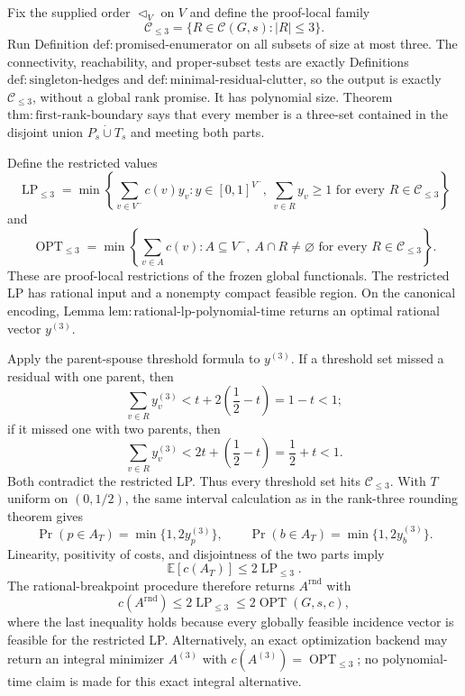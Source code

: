 Fix the supplied order \(\triangleleft_V\) on \(V\) and define the
proof-local family
\[
 \mathcal C_{\leq3}=\{R\in\mathcal C(G,s):|R|\leq3\}.
\]
Run Definition \(\mathrm{def{:}promised\mbox{-}enumerator}\) on all
subsets of size at most three.  The connectivity, reachability, and
proper-subset tests are exactly Definitions
\(\mathrm{def{:}singleton\mbox{-}hedges}\) and
\(\mathrm{def{:}minimal\mbox{-}residual\mbox{-}clutter}\), so the output
is exactly \(\mathcal C_{\leq3}\), without a global rank promise.  It has
polynomial size.  Theorem
\(\mathrm{thm{:}first\mbox{-}rank\mbox{-}boundary}\) says that every
member is a three-set contained in the disjoint union
\(P_s\mathbin{\dot\cup}T_s\) and meeting both parts.

Define the restricted values
\[
 \operatorname{LP}_{\leq3}
 =\min\left\{\sum_{v\in V^{-}}c(v)y_v:
 y\in[0,1]^{V^{-}},\ \sum_{v\in R}y_v\geq1
 \text{ for every }R\in\mathcal C_{\leq3}\right\}
\]
and
\[
 \operatorname{OPT}_{\leq3}
 =\min\left\{\sum_{v\in A}c(v):
 A\subseteq V^{-},\ A\cap R\neq\varnothing
 \text{ for every }R\in\mathcal C_{\leq3}\right\}.
\]
These are proof-local restrictions of the frozen global functionals.  The
restricted LP has rational input and a nonempty compact feasible region.
On the canonical encoding, Lemma
\(\mathrm{lem{:}rational\mbox{-}lp\mbox{-}polynomial\mbox{-}time}\)
returns an optimal rational vector \(y^{(3)}\).

Apply the parent-spouse threshold formula to \(y^{(3)}\).  If a threshold
set missed a residual with one parent, then
\[
 \sum_{v\in R}y^{(3)}_v
 <t+2\left(\frac12-t\right)=1-t<1;
\]
if it missed one with two parents, then
\[
 \sum_{v\in R}y^{(3)}_v
 <2t+\left(\frac12-t\right)=\frac12+t<1.
\]
Both contradict the restricted LP.  Thus every threshold set hits
\(\mathcal C_{\leq3}\).  With \(T\) uniform on \((0,1/2)\), the same
interval calculation as in the rank-three rounding theorem gives
\[
 \Pr(p\in A_T)=\min\{1,2y^{(3)}_p\},\qquad
 \Pr(b\in A_T)=\min\{1,2y^{(3)}_b\}.
\]
Linearity, positivity of costs, and disjointness of the two parts imply
\[
 \mathbb E[c(A_T)]\leq2\operatorname{LP}_{\leq3}.
\]
The rational-breakpoint procedure therefore returns
\(A^{\mathrm{rnd}}\) with
\[
 c(A^{\mathrm{rnd}})\leq2\operatorname{LP}_{\leq3}
 \leq2\operatorname{OPT}(G,s,c),
\]
where the last inequality holds because every globally feasible incidence
vector is feasible for the restricted LP.  Alternatively, an exact
optimization backend may return an integral minimizer \(A^{(3)}\) with
\(c(A^{(3)})=\operatorname{OPT}_{\leq3}\); no polynomial-time claim is
made for this exact integral alternative.

